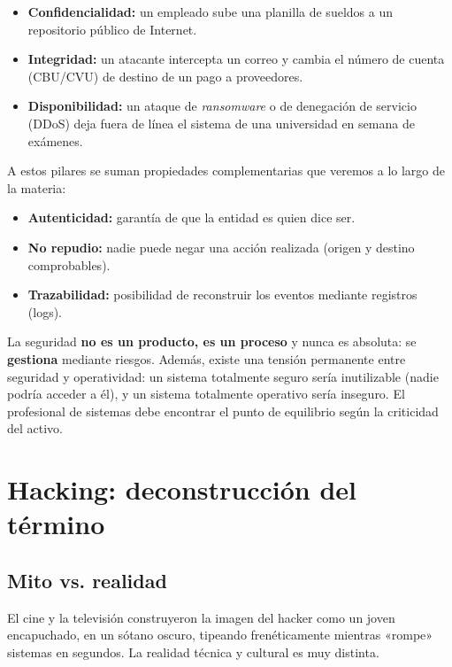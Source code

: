 \documentclass[11pt,a4paper]{article}
\begin{document}
\begin{ejemplo}
\begin{itemize}[leftmargin=*]
  \item \textbf{Confidencialidad:} un empleado sube una planilla de sueldos a un repositorio público de Internet.
  \item \textbf{Integridad:} un atacante intercepta un correo y cambia el número de cuenta (CBU/CVU) de destino de un pago a proveedores.
  \item \textbf{Disponibilidad:} un ataque de \textit{ransomware} o de denegación de servicio (DDoS) deja fuera de línea el sistema de una universidad en semana de exámenes.
\end{itemize}
\end{ejemplo}

A estos pilares se suman propiedades complementarias que veremos a lo largo de la materia:

\begin{itemize}[leftmargin=*]
  \item \textbf{Autenticidad:} garantía de que la entidad es quien dice ser.
  \item \textbf{No repudio:} nadie puede negar una acción realizada (origen y destino comprobables).
  \item \textbf{Trazabilidad:} posibilidad de reconstruir los eventos mediante registros (logs).
\end{itemize}

\begin{clave}
La seguridad \textbf{no es un producto, es un proceso} y nunca es absoluta: se \textbf{gestiona} mediante riesgos. Además, existe una tensión permanente entre seguridad y operatividad: un sistema totalmente seguro sería inutilizable (nadie podría acceder a él), y un sistema totalmente operativo sería inseguro. El profesional de sistemas debe encontrar el punto de equilibrio según la criticidad del activo.
\end{clave}

\section{Hacking: deconstrucción del término}

\subsection{Mito vs. realidad}
El cine y la televisión construyeron la imagen del hacker como un joven encapuchado, en un sótano oscuro, tipeando frenéticamente mientras «rompe» sistemas en segundos. La realidad técnica y cultural es muy distinta.
\end{document}
